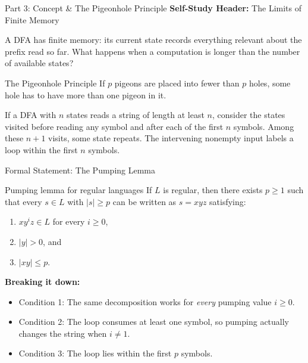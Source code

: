 \documentclass[10pt]{beamer}
\begin{document}
\begin{frame}{Part 3: Concept \& The Pigeonhole Principle}
  \small
  \textbf{Self-Study Header:} The Limits of Finite Memory
  \vspace{0.2cm}
  
  A DFA has finite memory: its current state records everything relevant about
  the prefix read so far. What happens when a computation is longer than the
  number of available states?
  \pause
  
  \begin{block}{The Pigeonhole Principle}
    If $p$ pigeons are placed into fewer than $p$ holes, some hole has to have more than one pigeon in it. 
  \end{block}
  \pause
  If a DFA with $n$ states reads a string of length at least $n$, consider the
  states visited before reading any symbol and after each of the first $n$
  symbols. Among these $n+1$ visits, some state repeats. The intervening
  nonempty input labels a loop within the first $n$ symbols.
  
  \begin{center}
  \end{center}
\end{frame}

\begin{frame}{Formal Statement: The Pumping Lemma}
  \small
  \begin{block}{Pumping lemma for regular languages}
    If $L$ is regular, then there exists $p\geq1$ such that every
    $s\in L$ with $|s|\geq p$ can be written as $s=xyz$ satisfying:
    \begin{enumerate}
        \item $xy^{i}z \in L$ for every $i\geq0$,
        \item $|y| > 0$, and
        \item $|xy| \leq p$.
    \end{enumerate}
  \end{block}
  \pause
  \vspace{0.2cm}
  \textbf{Breaking it down:}
  \begin{itemize}
      \item Condition 1: The same decomposition works for \emph{every}
        pumping value $i\geq0$.
      \item Condition 2: The loop consumes at least one symbol, so pumping
        actually changes the string when $i\neq1$.
      \item Condition 3: The loop lies within the first $p$ symbols.
  \end{itemize}
\end{frame}
\end{document}
